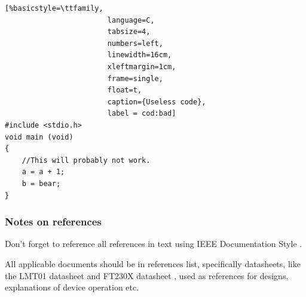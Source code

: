 \documentclass[11pt,a4paper]{article}
\begin{document}
\begin{lstlisting}[%basicstyle=\ttfamily,
						language=C,
						tabsize=4,
						numbers=left,
						linewidth=16cm,
						xleftmargin=1cm,
						frame=single,
						float=t,
						caption={Useless code},
						label = cod:bad]
#include <stdio.h>
void main (void)
{
	//This will probably not work.
	a = a + 1;
	b = bear;
}
\end{lstlisting}

\subsubsection{Notes on references}
Don't forget to reference all references in text using IEEE Documentation Style \cite{Graffox:2009}.

All applicable documents should be in references list, specifically datasheets, like the LMT01 datasheet \cite{lmt01:2016} and FT230X datasheet \cite{fx230:2016}, used as references for designs, explanations of device operation etc.

\clearpage %




\end{document}
